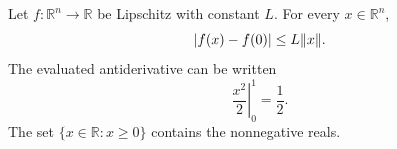 \documentclass{article}
\DeclarePairedDelimiter{\abs}{\lvert}{\rvert}
\DeclarePairedDelimiter{\norm}{\lVert}{\rVert}
\begin{document}
Let \(f\colon \mathbb{R}^n \to \mathbb{R}\) be Lipschitz with constant \(L\).
For every \(x\in\mathbb{R}^n\),
\[
  \abs*{f(x)-f(0)} \leq L\norm*{x}.
\]
The evaluated antiderivative can be written
\[
  \left. \frac{x^2}{2} \right|_{0}^{1} = \frac{1}{2}.
\]
The set \(\{x\in\mathbb{R}: x\geq 0\}\) contains the nonnegative reals.
\end{document}
